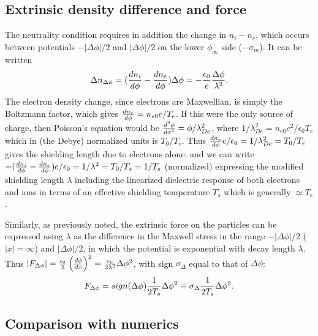 \documentclass[12pt]{article}
\begin{document}
\subsection{Extrinsic density difference and force}

The neutrality condition requires in addition the change in $n_i-n_e$,
which occurs between potentials $-|\Delta\phi|/2$ and $|\Delta\phi|/2$
on the lower $\phi_\infty$ side ($-\sigma_m$). It can be written
\begin{equation}
  \label{eq:Dpext}
  \Delta n_{\Delta\phi}= ({dn_i\over d\phi} - {dn_e\over
    d\phi})\Delta\phi
  =-{\epsilon_0\over e}{\Delta \phi\over\lambda^2}.
\end{equation}
The electron density change, since electrons are Maxwellian, is simply
the Boltzmann factor, which gives ${dn_e\over d\phi}=n_{e0}e/T_e$. If
this were the only source of charge, then Poisson's equation would be
${d^2\phi\over dx^2}=\phi/\lambda_{De}^2$, where
$1/\lambda_{De}^2=n_{e0}e^2/\epsilon_0T_e$ which in (the Debye)
normalized units is $T_0/T_e$.  Thus
${dn_e\over d\phi}e/\epsilon_0=1/\lambda_{De}^2=T_0/T_e$ gives the
shielding length due to electrons alone; and we can write
$-({dn_i\over d\phi} - {dn_e\over
  d\phi})e/\epsilon_0=1/\lambda^2=T_0/T_s=1/T_s$ (normalized)
expressing the modified shielding length $\lambda$ including the
linearized dielectric response of both electrons and ions in terms of
an effective shielding temperature $T_s$ which is generally
$\simeq T_e$.



Similarly, as previously noted, the extrinsic force on the particles
can be expressed using $\lambda$ as the difference in the Maxwell
stress in the range $-|\Delta\phi|/2$ ($|x|=\infty$) and
$|\Delta\phi|/2$, in which the potential is exponential with decay
length $\lambda$. Thus
$|F_{\Delta\phi}|= {\epsilon_0\over2}\left(d\phi\over dx\right)^2=
{\epsilon_0\over 2\lambda^2}\Delta\phi^2$, with sign $\sigma_\Delta$
equal to that of $\Delta\phi$:
\begin{equation}
  \label{eq:forceco}
F_{\Delta\phi}=sign(\Delta\phi){1\over 2T_s}\Delta\phi^2\equiv\sigma_\Delta{1\over 2T_s}\Delta\phi^2.  
\end{equation}

\subsection{Comparison with numerics}
\end{document}
